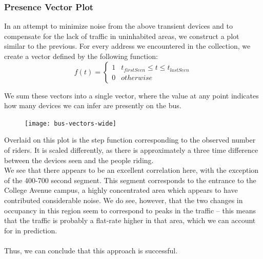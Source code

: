 \documentclass[letterpaper,abstract=on,titlepage=false]{scrreprt}
\begin{document}
	\subsubsection*{Presence Vector Plot}
		In an attempt to minimize noise from the above transient devices and to compensate for the lack of traffic in uninhabited areas, we construct a plot similar to the previous. %
		For every address we encountered in the collection, we create a vector defined by the following function:
		\begin{displaymath}
		f(t) = \left\{
			\begin{array}{lr}
			1 & t_{firstSeen} \le t \le t_{lastSeen}\\
			0 & otherwise
			\end{array}
		\right.
		\end{displaymath}

		We sum these vectors into a single vector, where the value at any point indicates how many devices we can infer are presently on the bus.

		\begin{figure}[H]
		\texttt{[image: bus-vectors-wide]}
		\centering
		\end{figure}

		Overlaid on this plot is the step function corresponding to the observed number of riders.
		It is scaled differently, as there is approximately a three time difference between the devices seen and the people riding.
		\\
		We see that there appears to be an excellent correlation here, with the exception of the 400-700 second segment. %
		This segment corresponds to the entrance to the College Avenue campus, a highly concentrated area which appears to have contributed considerable noise.
		We do see, however, that the two changes in occupancy in this region seem to correspond to peaks in the traffic -- this means that the traffic is probably a flat-rate higher in that area, which we can account for in prediction.
		\\\\
		Thus, we can conclude that this approach is successful. %

\end{document}
